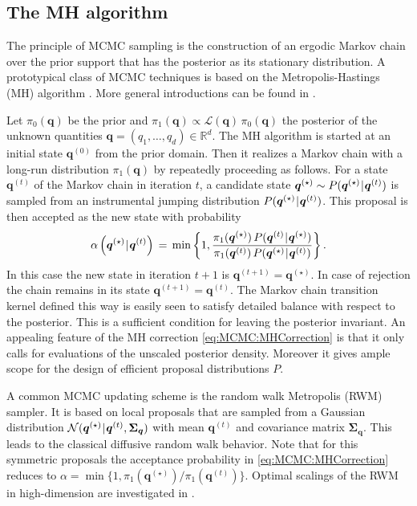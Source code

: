 \subsection{The MH algorithm}
The principle of MCMC sampling is the construction of an ergodic Markov chain over the prior support that has the posterior as its stationary distribution.
A prototypical class of MCMC techniques is based on the Metropolis-Hastings (MH) algorithm \cite{MCMC:Metropolis1953,MCMC:Hastings1970}.
More general introductions can be found in \cite{MCMC:Robert2004,MCMC:Brooks2011}.
\par %
Let \(\pi_0(\bm{q})\) be the prior and \(\pi_1(\bm{q}) \propto \mathcal{L}(\bm{q}) \, \pi_0(\bm{q})\) the posterior of the unknown quantities \(\bm{q} = (q_1,\ldots,q_d) \in \mathds{R}^d\).
The MH algorithm is started at an initial state \(\bm{q}^{(0)}\) from the prior domain.
Then it realizes a Markov chain with a long-run distribution \(\pi_1(\bm{q})\) by repeatedly proceeding as follows.
For a state \(\bm{q}^{(t)}\) of the Markov chain in iteration \(t\), a candidate state \(\bm{q}^{(\star)} \sim P(\bm{q}^{(\star)} {\:\!}|{\:\!} \bm{q}^{(t)})\)
is sampled from an instrumental jumping distribution \(P(\bm{q}^{(\star)} {\:\!}|{\:\!} \bm{q}^{(t)})\).
This proposal is then accepted as the new state with probability
\begin{equation} \label{eq:MCMC:MHCorrection}
  \alpha \left( \bm{q}^{(\star)} {\:\!}|{\:\!} \bm{q}^{(t)} \right)
  \, = \, \operatorname{min} \left\{ 1,\frac{\pi_1(\bm{q}^{(\star)}) \, P(\bm{q}^{(t)} {\:\!}|{\:\!} \bm{q}^{(\star)})}{\pi_1(\bm{q}^{(t)}) \, P(\bm{q}^{(\star)} {\:\!}|{\:\!} \bm{q}^{(t)})} \right\}.
\end{equation}
In this case the new state in iteration \(t+1\) is \(\bm{q}^{(t+1)} = \bm{q}^{(\star)}\).
In case of rejection the chain remains in its state \(\bm{q}^{(t+1)} = \bm{q}^{(t)}\).
The Markov chain transition kernel defined this way is easily seen to satisfy detailed balance with respect to the posterior.
This is a sufficient condition for leaving the posterior invariant.
An appealing feature of the MH correction \cref{eq:MCMC:MHCorrection} is that it only calls for evaluations of the unscaled posterior density.
Moreover it gives ample scope for the design of efficient proposal distributions \(P\).
\par %
A common MCMC updating scheme is the random walk Metropolis (RWM) sampler.
It is based on local proposals that are sampled from a Gaussian distribution \(\mathcal{N}(\bm{q}^{(\star)} {\:\!}|{\:\!} \bm{q}^{(t)},\bm{\Sigma}_{\bm{q}})\) with mean \(\bm{q}^{(t)}\) and covariance matrix \(\bm{\Sigma}_{\bm{q}}\).
This leads to the classical diffusive random walk behavior.
Note that for this symmetric proposals the acceptance probability in \cref{eq:MCMC:MHCorrection} reduces to \(\alpha = \operatorname{min} \{ 1,\pi_1(\bm{q}^{(\star)}) / \pi_1(\bm{q}^{(t)}) \}\).
Optimal scalings of the RWM in high-dimension are investigated in \cite{MCMC:Roberts1997:b,MCMC:Roberts2001}.

